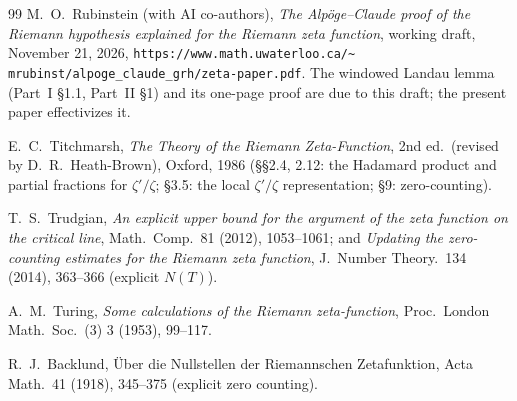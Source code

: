 \documentclass[11pt]{amsart}
\numberwithin{equation}{section}
\begin{document}
\begin{thebibliography}{99}
 M.~O.~Rubinstein (with AI co-authors), \emph{The
Alp\"oge--Claude proof of the Riemann hypothesis explained for the
Riemann zeta function}, working draft, November 21, 2026,
\texttt{https://www.math.uwaterloo.ca/\textasciitilde
mrubinst/alpoge\_claude\_grh/zeta-paper.pdf}. The windowed Landau
lemma (Part~I \S1.1, Part~II \S1) and its one-page proof are due to
this draft; the present paper effectivizes it.

 E.~C.~Titchmarsh, \emph{The Theory of the Riemann
Zeta-Function}, 2nd ed.\ (revised by D.~R.~Heath-Brown), Oxford, 1986
(\S\S2.4, 2.12: the Hadamard product and partial fractions for
$\zeta'/\zeta$; \S3.5: the local $\zeta'/\zeta$ representation;
\S9: zero-counting).

 T.~S.~Trudgian, \emph{An explicit upper bound for the
argument of the zeta function on the critical line}, Math.\ Comp.\ 81
(2012), 1053--1061; and \emph{Updating the zero-counting estimates for
the Riemann zeta function}, J.\ Number Theory.\ 134 (2014), 363--366
(explicit $N(T)$).

 A.~M.~Turing, \emph{Some calculations of the Riemann
zeta-function}, Proc.\ London Math.\ Soc.\ (3) 3 (1953), 99--117.

 R.~J.~Backlund, \"Uber die Nullstellen der
Riemannschen Zetafunktion, Acta Math.\ 41 (1918), 345--375 (explicit
zero counting).

\end{thebibliography}
\end{document}

